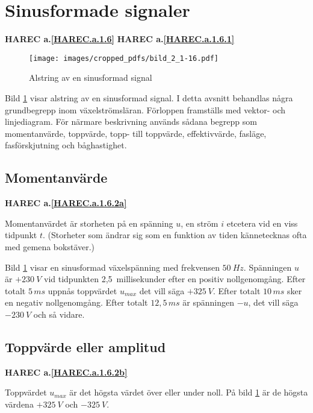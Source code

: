 \section{Sinusformade signaler}
\textbf{HAREC a.\ref{HAREC.a.1.6}\label{myHAREC.a.1.6}}
\textbf{HAREC a.\ref{HAREC.a.1.6.1}\label{myHAREC.a.1.6.1}}

\begin{figure}[ht]
\texttt{[image: images/cropped\_pdfs/bild\_2\_1-16.pdf]}
\caption{Alstring av en sinusformad signal}
\label{fig:BildII1-16}
\end{figure}

Bild \ref{fig:BildII1-16} visar alstring av en sinusformad signal.
I detta avsnitt behandlas några grundbegrepp inom växelströmsläran.
Förloppen framställs med vektor- och linjediagram.
För närmare beskrivning används sådana begrepp som momentanvärde,
toppvärde, topp- till toppvärde, effektivvärde, fasläge, fasförskjutning och
båghastighet.

\subsection{Momentanvärde}
\textbf{HAREC a.\ref{HAREC.a.1.6.2a}\label{myHAREC.a.1.6.2a}}

Momentanvärdet är storheten på en spänning \(u\), en ström \(i\) etcetera vid en
viss tidpunkt \(t\).
(Storheter som ändrar sig som en funktion av tiden kännetecknas ofta med gemena
bokstäver.)

Bild \ref{fig:BildII1-16} visar en sinusformad växelspänning med frekvensen
\(50\ Hz\).
Spänningen \(u\) är \(+230\ V\) vid tidpunkten 2,5~millisekunder efter en
positiv nollgenomgång.
Efter totalt \(5\, ms\) uppnås toppvärdet \(u_{max}\) det vill säga \(+325\ V\).
Efter totalt \(10\, ms\) sker en negativ nollgenomgång.
Efter totalt \(12,5\, ms\) är spänningen \(-u\), det vill säga \(-230\ V\) och så vidare.

\subsection{Toppvärde eller amplitud}
\textbf{HAREC a.\ref{HAREC.a.1.6.2b}\label{myHAREC.a.1.6.2b}}

Toppvärdet \(u_{max}\) är det högsta värdet över eller under noll.
På bild \ref{fig:BildII1-16} är de högsta värdena \(+325\ V\) och \(-325\ V\).

